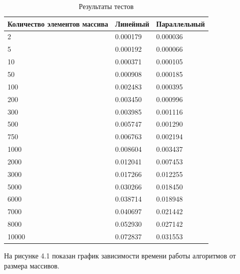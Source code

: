 \FloatBarrier
\begin{table}[h]
	\caption{Результаты тестов}
	\centering
	\begin{tabular}{ | l | l | l |}
		\hline
		Количество элементов массива & Линейный & Параллельный\\ 
		\hline
		2 & 0.000179 & 0.000036\\
		5 & 0.000192 & 0.000066\\
		10 & 0.000371 & 0.000105\\
		50 & 0.000908 & 0.000185\\
		100 & 0.002483 & 0.000395\\
		200 & 0.003450 & 0.000996\\
		300 & 0.003985 & 0.001116\\
		500 & 0.005747 & 0.001290\\
		750 & 0.006763 & 0.002194\\
		1000 & 0.008604 & 0.003437\\
		2000 & 0.012041 & 0.007453\\
		3000 & 0.017266 & 0.012255\\
		5000 & 0.030266 & 0.018450\\
		6000 & 0.038714 & 0.018948\\
		7000 & 0.040697 & 0.021442\\
		8000 & 0.052930 & 0.027142\\
		10000 & 0.072837 & 0.031553\\
		\hline
	\end{tabular}
\end{table}
\FloatBarrier

На рисунке 4.1 показан график зависимости времени работы алгоритмов от размера массивов.

